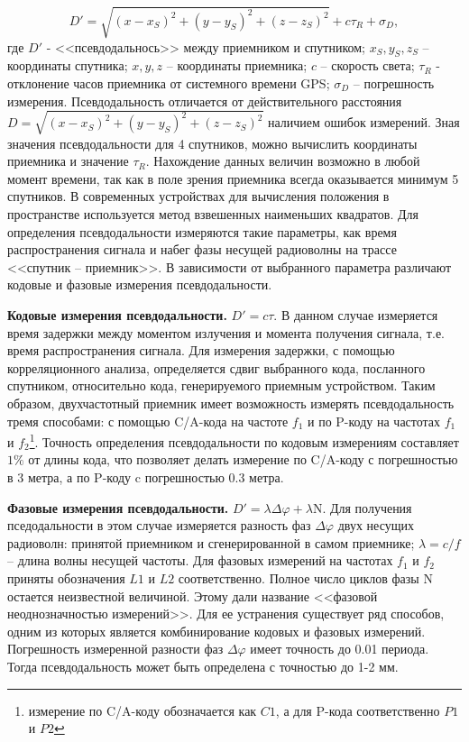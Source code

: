 \documentclass[a4paper]{article}
\begin{document}
\begin{equation}
D' = \sqrt{(x - x_S)^2 + (y - y_S)^2 + (z - z_S)^2} + c\tau_R +\sigma_D,
\end{equation}
где $D'$ - <<псевдодальнось>> между приемником и спутником; $x_S, y_S, z_S$ -- координаты спутника; $x, y, z$ -- координаты приемника; $c$ -- скорость света; $\tau_R$ - отклонение часов приемника от системного времени GPS; $\sigma_D$ -- погрешность измерения. 
Псевдодальность отличается от действительного расстояния $D = \sqrt{(x - x_S) ^ 2 + (y - y_S) ^ 2 + (z - z_S) ^ 2}$ наличием ошибок измерений. 
Зная значения псевдодальности для 4 спутников, можно вычислить координаты приемника и значение $\tau_R$. Нахождение данных величин возможно в любой момент времени, так как в поле зрения приемника всегда оказывается минимум 5 спутников. В современных устройствах для вычисления положения в пространстве используется метод взвешенных наименьших квадратов. Для определения псевдодальности измеряются такие параметры, как время распространения сигнала и набег фазы несущей радиоволны на трассе <<спутник -- приемник>>. В зависимости от выбранного параметра различают кодовые и фазовые измерения псевдодальности.

\textbf{Кодовые измерения псевдодальности.} $D' = c \tau$. В данном случае измеряется время задержки между моментом излучения и момента получения сигнала, т.е. время распространения сигнала. Для измерения задержки, с помощью корреляционного анализа, определяется сдвиг выбранного кода, посланного спутником, относительно кода, генерируемого приемным устройством. Таким образом, двухчастотный приемник имеет возможность измерять псевдодальность тремя способами: с помощью C/A-кода на частоте $f_1$ и по P-коду на частотах $f_1$ и $f_2$\footnote{измерение по C/A-коду обозначается как $C1$, а для P-кода соответственно $P1$ и $P2$}. Точность определения псевдодальности по кодовым измерениям составляет $1\%$ от длины кода, что позволяет делать измерение по C/A-коду с погрешностью в 3 метра, а по P-коду c погрешностью 0.3 метра.

\textbf{Фазовые измерения псевдодальности.} $D' = \lambda \Delta \varphi + \lambda \text{N}$. Для получения пседодальности в этом случае измеряется разность фаз $\Delta\varphi$ двух несущих радиоволн: принятой приемником и сгенерированной в самом приемнике; $\lambda = c / f$ -- длина волны несущей частоты. Для фазовых измерений на частотах $f_1$ и $f_2$ приняты обозначения $L1$ и $L2$ соответственно. Полное число циклов фазы N остается неизвестной величиной. Этому дали название <<фазовой неоднозначностью измерений>>. Для ее устранения существует ряд способов, одним из которых является комбинирование кодовых и фазовых измерений. Погрешность измеренной разности фаз $\Delta\varphi$ имеет точность до 0.01 периода. Тогда псевдодальность может быть определена с точностью до 1-2 мм.
\end{document}

